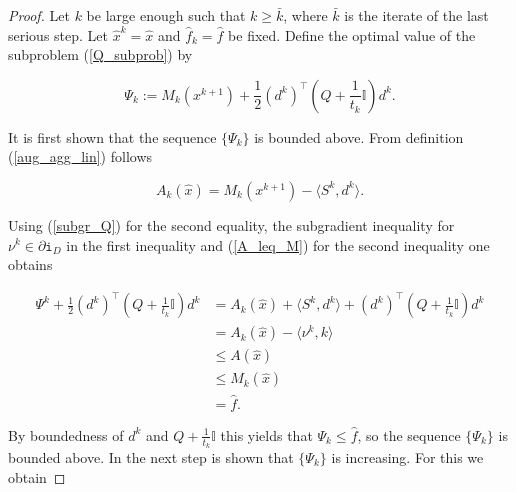 \begin{proof}
	Let \(k\) be large enough such that \(k \geq \bar{k}\), where \(\bar{k}\) is the iterate of the last serious step. Let \(\hat{x}^k = \hat{x}\) and \(\hat{f}_k=\hat{f}\) be fixed.
	Define the optimal value of the subproblem (\ref{Q_subprob}) by 
	
	\begin{equation}
		\Psi_k := M_k(x^{k+1})+\frac{1}{2}\left(d^k\right)^{\top}\left(Q+\frac{1}{t_k}\mathbb{I}\right)d^k.
		\label{Psi}
	\end{equation}
	
	It is first shown that the sequence \(\{\Psi_k\}\) is bounded above.
	From definition (\ref{aug_agg_lin}) follows

	
	\begin{equation*}
		A_k(\hat{x}) = M_k(x^{k+1})-\langle S^k,d^k \rangle.
	\end{equation*}
	
Using (\ref{subgr_Q}) for the second equality, the subgradient inequality for \(\nu^k \in \partial \mathtt{i}_{D}\) in the first inequality and (\ref{A_leq_M}) for the second inequality  one obtains
	
	\begin{align*}
		\Psi^k+\frac{1}{2}\left(d^{k}\right)^{\top}\left(Q+\frac{1}{t_k}\mathbb{I}\right)d^k &= A_k(\hat{x})+\langle S^k,d^k\rangle + \left(d^{k}\right)^{\top}\left(Q+\frac{1}{t_k}\mathbb{I}\right)d^k \\
		&= A_k(\hat{x})-\langle \nu^k,k \rangle \\
		&\leq A(\hat{x}) \\
		&\leq M_k(\hat{x}) \\
		& = \hat{f}.
	\end{align*}
	
By boundedness of \(d^k\) and \(Q+\frac{1}{t_k}\mathbb{I}\) this yields that \(\Psi_k \leq \hat{f}\), so the sequence \(\{\Psi_k\}\) is bounded above.
	In the next step is shown that \(\{\Psi_k\}\) is increasing. For this we obtain
	

\end{proof}

